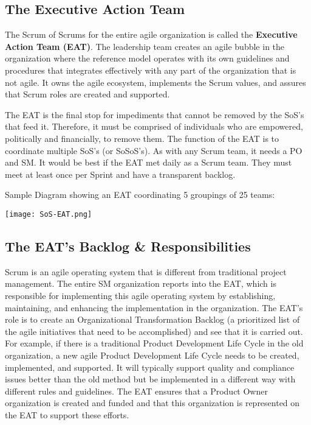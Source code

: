 \documentclass[12pt,a4paper,parskip=full]{scrartcl}
\begin{document}
\subsection{The Executive Action Team}
The Scrum of Scrums for the entire agile organization is called the
\textbf{Executive Action Team (EAT)}. The leadership team creates an agile bubble
in the organization where the reference model operates with 
its own guidelines and procedures that integrates effectively 
with any part of the organization that is not agile. It owns the agile ecosystem, 
implements the Scrum values, and assures that 
Scrum roles are created and supported.

The EAT is the final stop for
impediments that cannot be removed by the SoS's that feed it. Therefore, it
must be comprised of individuals who are empowered, politically and
financially, to remove them. 
The function of the EAT is to coordinate
multiple SoS's (or SoSoS's). As with any Scrum team, it needs a PO and SM.
It would be best if the EAT met daily as a Scrum team. They must meet at
least once per Sprint and have a transparent backlog.

Sample Diagram showing an EAT coordinating 5 groupings of 25 teams:

\texttt{[image: SoS-EAT.png]}

\subsection{The EAT's Backlog \& Responsibilities}
Scrum is an agile operating system that is different from traditional
project management. The entire SM organization reports into the EAT, which
is responsible for implementing this agile operating system by
establishing, maintaining, and enhancing the implementation in the
organization.
The EAT's role is to create an Organizational Transformation Backlog (a
prioritized list of the agile initiatives that need to be accomplished) and
see that it is carried out. For example, if there is a traditional Product
Development Life Cycle in the old organization, a new agile Product
Development Life Cycle needs to be created, implemented, and supported. It
will typically support quality and compliance issues better than the old
method but be implemented in a different way with different rules and
guidelines. The EAT ensures that a Product Owner organization is created and funded
and that this organization is represented on the EAT to support these efforts.
\end{document}
